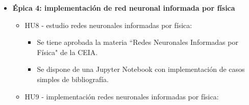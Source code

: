 \documentclass[
11pt, %
]{charter}
\begin{document}
\begin{itemize}
\begin{itemize}
\begin{itemize}
          \item Se dispone de una Jupytern Notebook con un modelo que implementa los embeddings y feature engineering, comparado con el modelo base de la HU5.
        \end{itemize}
      \item HU7 - figuras de mérito:
        \begin{itemize}
          \item Se tiene una Jupyter Notebook donde se analiza si los embeddings entrenados en la HU6 representan características puntuales de los perfiles de potencia.
          \item Se tiene un documento donde se explican figuras de mérito de los perfiles de potencia en función de los embeddings y feature engineering realizados.
        \end{itemize}
    \end{itemize}
  \item \textbf{Épica 4: implementación de red neuronal informada por física}
    \begin{itemize}
      \item HU8 - estudio redes neuronales informadas por física:
        \begin{itemize}
          \item Se tiene aprobada la materia ``Redes Neuronales Informadas por Física" de la CEIA.
          \item Se dispone de una Jupyter Notebook con implementación de casos simples de bibliografía.
        \end{itemize}
      \item HU9 - implementación redes neuronales informadas por física:

\end{itemize}
\end{itemize}
\end{document}
